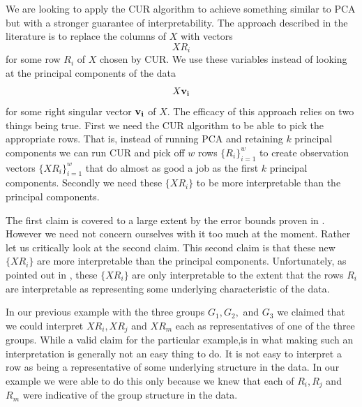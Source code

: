 \documentclass{book}
\begin{document}
We are looking to apply the CUR algorithm to achieve something similar to PCA but with a stronger guarantee of interpretability. The approach described in the literature is to replace the columns of $X$ with vectors
$$
XR_i
$$
for some row $R_i$ of $X$ chosen by CUR. We use these variables instead of looking at the principal components of the data 
$$
X{\bf v_i}
$$
for some right singular vector ${\bf v_i}$ of $X$. The efficacy of this approach relies on two things being true. First we need the CUR algorithm to be able to pick the appropriate rows. That is, instead of running PCA and retaining $k$ principal components we can run CUR and pick off $w$ rows $\{R_i\}_{i=1}^{w}$ to create observation vectors $\{XR_i\}_{i=1}^{w}$ that do almost as good a job as the first $k$ principal components. Secondly we need these $\{XR_i\}$ to be more interpretable than the principal components. 

The first claim is covered to a large extent by the error bounds proven in \newline\cite{pnas}. However we need not concern ourselves with it too much at the moment. Rather let us critically look at the second claim. This second claim is that these new $\{XR_i\}$ are more interpretable than the principal components. Unfortunately, as pointed out in \cite{pnas}, these $\{XR_i\}$ are only interpretable to the extent that the rows $R_i$ are interpretable as representing some underlying characteristic of the data. 

In our previous example with the three groups $G_1,G_2,$ and $G_3$ we claimed that we could interpret $XR_i,XR_j$ and $XR_m$ each as representatives of one of the three groups. While a valid claim for the particular example,is in what  making such an interpretation is generally not an easy thing to do. It is not easy to interpret a row as being a representative of some underlying structure in the data. In our example we were able to do this only because we knew that each of $R_i,R_j$ and $R_m$ were indicative of the group structure in the data. 
\end{document}
